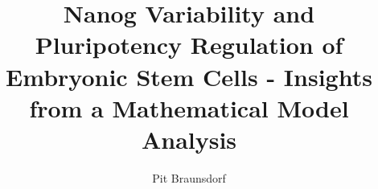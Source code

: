 \documentclass[12pt,a4paper]{scrreprt}
\author{Pit Braunsdorf}
\title{Nanog Variability and Pluripotency Regulation of Embryonic Stem Cells - Insights from a Mathematical Model Analysis}
\begin{document}
	\maketitle
	\tableofcontents
	
	\listoftodos
	
	
	
	
	
	 
	
\end{document}
